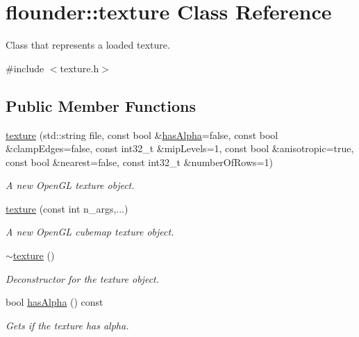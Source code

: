 \hypertarget{classflounder_1_1texture}{}\section{flounder\+:\+:texture Class Reference}
\label{classflounder_1_1texture}


Class that represents a loaded texture.  




{\ttfamily \#include $<$texture.\+h$>$}

\subsection*{Public Member Functions}
\begin{DoxyCompactItemize}
\item 
\hyperlink{classflounder_1_1texture_a62ac74067eac27177bb9b8e4483a7a55}{texture} (std\+::string file, const bool \&\hyperlink{classflounder_1_1texture_aa74c0c1cb920f5f131832ec6498eba47}{has\+Alpha}=false, const bool \&clamp\+Edges=false, const int32\+\_\+t \&mip\+Levels=1, const bool \&anisotropic=true, const bool \&nearest=false, const int32\+\_\+t \&number\+Of\+Rows=1)
\begin{DoxyCompactList}\small\item\em A new Open\+GL texture object. \end{DoxyCompactList}\item 
\hyperlink{classflounder_1_1texture_a907f7472caf155686539bd54fb451166}{texture} (const int n\+\_\+args,...)
\begin{DoxyCompactList}\small\item\em A new Open\+GL cubemap texture object. \end{DoxyCompactList}\item 
\hyperlink{classflounder_1_1texture_a8271c7f9860a5a235be9b1207bed2c39}{$\sim$texture} ()
\begin{DoxyCompactList}\small\item\em Deconstructor for the texture object. \end{DoxyCompactList}\item 
bool \hyperlink{classflounder_1_1texture_aa74c0c1cb920f5f131832ec6498eba47}{has\+Alpha} () const
\begin{DoxyCompactList}\small\item\em Gets if the texture has alpha. \end{DoxyCompactList}\item 

\end{DoxyCompactItemize}
